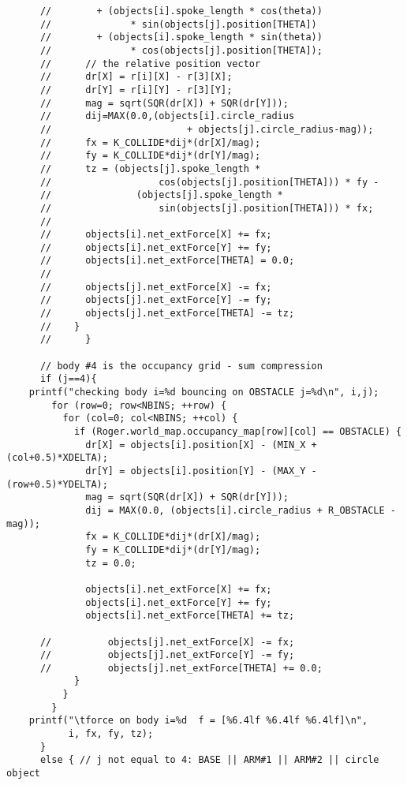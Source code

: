 \documentclass{article}
\begin{document}
\begin{verbatim}
      //	    + (objects[i].spoke_length * cos(theta))
      //	          * sin(objects[j].position[THETA]) 
      //	    + (objects[i].spoke_length * sin(theta))
      //	          * cos(objects[j].position[THETA]);
      //	  // the relative position vector
      //	  dr[X] = r[i][X] - r[3][X];
      //	  dr[Y] = r[i][Y] - r[3][Y];
      //	  mag = sqrt(SQR(dr[X]) + SQR(dr[Y]));
      //	  dij=MAX(0.0,(objects[i].circle_radius
      //                        + objects[j].circle_radius-mag)); 
      //	  fx = K_COLLIDE*dij*(dr[X]/mag);
      //	  fy = K_COLLIDE*dij*(dr[Y]/mag);
      //	  tz = (objects[j].spoke_length *
      //                   cos(objects[j].position[THETA])) * fy -
      //               (objects[j].spoke_length *
      //                   sin(objects[j].position[THETA])) * fx;
      //
      //	  objects[i].net_extForce[X] += fx;
      //	  objects[i].net_extForce[Y] += fy;
      //	  objects[i].net_extForce[THETA] = 0.0;
      //
      //	  objects[j].net_extForce[X] -= fx;
      //	  objects[j].net_extForce[Y] -= fy;
      //	  objects[j].net_extForce[THETA] -= tz;
      //	}	    
      //      }

      // body #4 is the occupancy grid - sum compression      
      if (j==4){ 
	printf("checking body i=%d bouncing on OBSTACLE j=%d\n", i,j);
      	for (row=0; row<NBINS; ++row) {
      	  for (col=0; col<NBINS; ++col) {
      	    if (Roger.world_map.occupancy_map[row][col] == OBSTACLE) {
      	      dr[X] = objects[i].position[X] - (MIN_X + (col+0.5)*XDELTA);
      	      dr[Y] = objects[i].position[Y] - (MAX_Y - (row+0.5)*YDELTA);
      	      mag = sqrt(SQR(dr[X]) + SQR(dr[Y]));
      	      dij = MAX(0.0, (objects[i].circle_radius + R_OBSTACLE - mag));
      	      fx = K_COLLIDE*dij*(dr[X]/mag);
      	      fy = K_COLLIDE*dij*(dr[Y]/mag);
      	      tz = 0.0;
      
      	      objects[i].net_extForce[X] += fx;
      	      objects[i].net_extForce[Y] += fy;
      	      objects[i].net_extForce[THETA] += tz;
      
      //	      objects[j].net_extForce[X] -= fx;
      //	      objects[j].net_extForce[Y] -= fy;
      //	      objects[j].net_extForce[THETA] += 0.0;
      	    }
      	  }
      	}
	printf("\tforce on body i=%d  f = [%6.4lf %6.4lf %6.4lf]\n",
	       i, fx, fy, tz);
      }
      else { // j not equal to 4: BASE || ARM#1 || ARM#2 || circle object



\end{verbatim}
\end{document}
